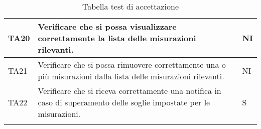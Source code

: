 \begin{longtable}{|C{1.9cm}|L{7cm}|C{2cm}|}
    TA20 & Verificare che si possa visualizzare correttamente la lista delle misurazioni rilevanti. & NI \\
    \hline
    
    TA21 & Verificare che si possa rimuovere correttamente una o più misurazioni dalla lista delle misurazioni rilevanti. & NI \\
    \hline
    
    TA22 & Verificare che si riceva correttamente una notifica in caso di superamento delle soglie impostate per le misurazioni. & S \\
    \hline
    
    \caption{Tabella test di accettazione}
\end{longtable}

\pagebreak